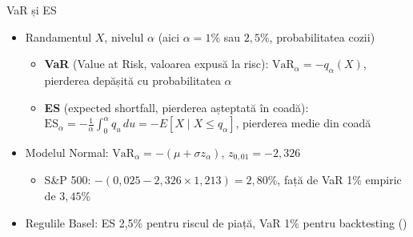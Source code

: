 \begin{frame}{VaR și ES}
\itemsize{\small}
\begin{itemize}
    \item Randamentul $X$, nivelul $\alpha$ (aici $\alpha = 1\%$ sau $2{,}5\%$, probabilitatea cozii)
    \begin{itemize}
        \item \textbf{VaR} (Value at Risk, valoarea expusă la risc): $\mathrm{VaR}_\alpha = -q_\alpha(X)$, pierderea depășită cu probabilitatea $\alpha$
        \item \textbf{ES} (expected shortfall, pierderea așteptată în coadă): $\mathrm{ES}_\alpha = -\frac{1}{\alpha}\int_0^\alpha q_u\, du = -E[X \mid X \le q_\alpha]$, pierderea medie din coadă
    \end{itemize}
    \item Modelul Normal: $\mathrm{VaR}_\alpha = -(\mu + \sigma z_\alpha)$, $z_{0{,}01} = -2{,}326$
    \begin{itemize}
        \item S\&P 500: $-(0{,}025 - 2{,}326 \times 1{,}213) = 2{,}80\%$, față de VaR 1\% empiric de $3{,}45\%$
    \end{itemize}
    \item Regulile Basel: ES 2,5\% pentru riscul de piață, VaR 1\% pentru backtesting ()
\end{itemize}
\end{frame}

